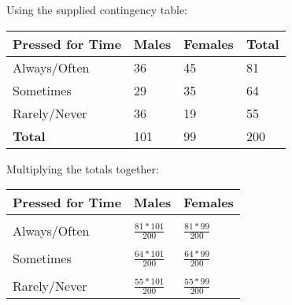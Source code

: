 \documentclass[oneside, a4paper]{article}
\begin{document}
\begin{center}
    Using the supplied contingency table:

    \begin{table}[H]
        \centering
        \begin{tabular}{|l|l|l|l|}
        \hline
        \textbf{Pressed for Time} & \textbf{Males} & \textbf{Females} & \textbf{Total} \\ \hline
        Always/Often              & 36             & 45               & 81             \\ \hline
        Sometimes                 & 29             & 35               & 64             \\ \hline
        Rarely/Never              & 36             & 19               & 55             \\ \hline
        \textbf{Total}            & 101            & 99               & 200            \\ \hline
        \end{tabular}
    \end{table}

    Multiplying the totals together:
    \begin{table}[H]
        \centering
        \begin{tabular}{|l|l|l|}
        \hline
        \textbf{Pressed for Time} & \textbf{Males} & \textbf{Females} \\ \hline
        \\[-1em]
        Always/Often              & $\frac{81*101}{200}$              & $\frac{81*99}{200}$               \\ \hline
        \\[-1em]
        Sometimes                 & $\frac{64*101}{200}$             & $\frac{64*99}{200}$               \\ \hline
        \\[-1em]
        Rarely/Never              & $\frac{55*101}{200}$             & $\frac{55*99}{200}$               \\ \hline
        \end{tabular}
    \end{table}
    

\end{center}
\end{document}
